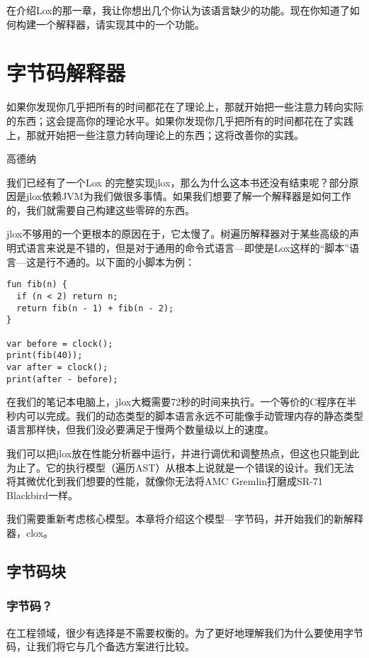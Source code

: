 \documentclass[cn,11pt,chinese]{elegantbook}
\begin{document}
{{{{{{{{{{{{{{{{{{{{{   在介绍Lox的那一章，我让你想出几个你认为该语言缺少的功能。现在你知道了如何构建一个解释器，请实现其中的一个功能。



\part{字节码解释器}

\epigraph{如果你发现你几乎把所有的时间都花在了理论上，那就开始把一些注意力转向实际的东西；这会提高你的理论水平。如果你发现你几乎把所有的时间都花在了实践上，那就开始把一些注意力转向理论上的东西；这将改善你的实践。}{高德纳}

我们已经有了一个Lox 的完整实现jlox，那么为什么这本书还没有结束呢？部分原因是jlox依赖JVM为我们做很多事情。如果我们想要了解一个解释器是如何工作的，我们就需要自己构建这些零碎的东西。

jlox不够用的一个更根本的原因在于，它太慢了。树遍历解释器对于某些高级的声明式语言来说是不错的，但是对于通用的命令式语言—即使是Lox这样的“脚本”语言—这是行不通的。以下面的小脚本为例：

\begin{verbatim}
fun fib(n) {
  if (n < 2) return n;
  return fib(n - 1) + fib(n - 2); 
}

var before = clock();
print(fib(40));
var after = clock();
print(after - before);
\end{verbatim}

在我们的笔记本电脑上，jlox大概需要72秒的时间来执行。一个等价的C程序在半秒内可以完成。我们的动态类型的脚本语言永远不可能像手动管理内存的静态类型语言那样快，但我们没必要满足于慢两个数量级以上的速度。

我们可以把jlox放在性能分析器中运行，并进行调优和调整热点，但这也只能到此为止了。它的执行模型（遍历AST）从根本上说就是一个错误的设计。我们无法将其微优化到我们想要的性能，就像你无法将AMC Gremlin打磨成SR-71 Blackbird一样。

我们需要重新考虑核心模型。本章将介绍这个模型—字节码，并开始我们的新解释器，clox。

\chapter{字节码块}

\section{字节码？}

在工程领域，很少有选择是不需要权衡的。为了更好地理解我们为什么要使用字节码，让我们将它与几个备选方案进行比较。

}}}}}}}}}}}}}}}}}}}}}
\end{document}
